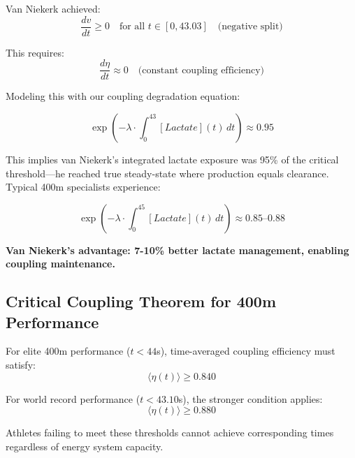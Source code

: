 Van Niekerk achieved:
\begin{equation}
\frac{dv}{dt} \geq 0 \quad \text{for all } t \in [0, 43.03] \quad \text{(negative split)}
\end{equation}

This requires:
\begin{equation}
\frac{d\eta}{dt} \approx 0 \quad \text{(constant coupling efficiency)}
\end{equation}

Modeling this with our coupling degradation equation:

\begin{equation}
\exp\left(-\lambda \cdot \int_0^{43} [Lactate](t) \, dt\right) \approx 0.95
\end{equation}

This implies van Niekerk's integrated lactate exposure was 95\% of the critical threshold—he reached true steady-state where production equals clearance. Typical 400m specialists experience:

\begin{equation}
\exp\left(-\lambda \cdot \int_0^{45} [Lactate](t) \, dt\right) \approx 0.85\text{--}0.88
\end{equation}

\textbf{Van Niekerk's advantage: 7-10\% better lactate management, enabling coupling maintenance.}

\subsection{Critical Coupling Theorem for 400m Performance}

\begin{theorem}
For elite 400m performance ($t < 44$s), time-averaged coupling efficiency must satisfy:
\begin{equation}
\langle \eta(t) \rangle \geq 0.840
\end{equation}

For world record performance ($t < 43.10$s), the stronger condition applies:
\begin{equation}
\langle \eta(t) \rangle \geq 0.880
\end{equation}

Athletes failing to meet these thresholds cannot achieve corresponding times regardless of energy system capacity.
\end{theorem}

